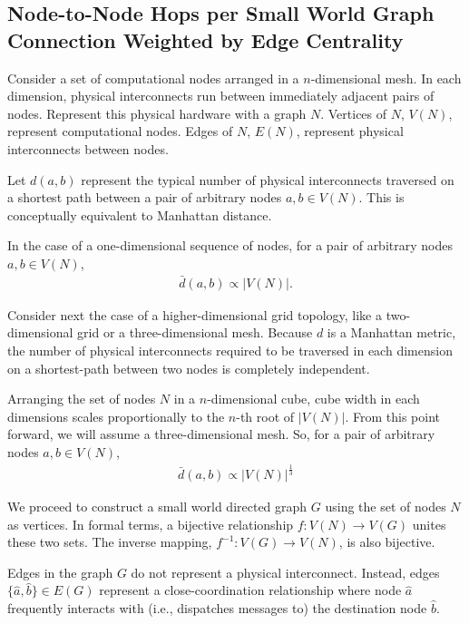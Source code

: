 \subsection{Node-to-Node Hops per Small World Graph Connection Weighted by Edge Centrality}

Consider a set of computational nodes arranged in a $n$-dimensional mesh.
In each dimension, physical interconnects run between immediately adjacent pairs of nodes.
Represent this physical hardware with a graph $N$.
Vertices of $N$, $V(N)$, represent computational nodes.
Edges of $N$, $E(N)$, represent physical interconnects between nodes.

Let $d(a,b)$ represent the typical number of physical interconnects traversed on a shortest path between a pair of arbitrary nodes $a, b \in V(N)$.
This is conceptually equivalent to Manhattan distance.

In the case of a one-dimensional sequence of nodes, for a pair of arbitrary nodes $a,b \in V(N)$,
\begin{align*}
\bar{d}(a,b) \propto |V(N)|.
\end{align*}

Consider next the case of a higher-dimensional grid topology, like a two-dimensional grid or a three-dimensional mesh.
Because $d$ is a Manhattan metric, the number of physical interconnects required to be traversed in each dimension on a shortest-path between two nodes is completely independent.

Arranging the set of nodes $N$ in a $n$-dimensional cube, cube width in each dimensions scales proportionally to the $n$-th root of $|V(N)|$.
From this point forward, we will assume a three-dimensional mesh.
So, for a pair of arbitrary nodes $a,b \in V(N)$,
\begin{align} \label{eqn:mesh_prop}
\bar{d}(a, b) \propto |V(N)|^{\frac{1}{3}}
\end{align}

We proceed to construct a small world directed graph $G$ using the set of nodes $N$ as vertices.
In formal terms, a bijective relationship $f: V(N) \rightarrow V(G)$ unites these two sets.
The inverse mapping, $f^{-1}: V(G) \rightarrow V(N)$, is also bijective.

Edges in the graph $G$ do not represent a physical interconnect.
Instead, edges $\{\hat{a}, \hat{b}\} \in E(G)$ represent a close-coordination relationship where node $\hat{a}$ frequently interacts with (i.e., dispatches messages to) the destination node $\hat{b}$.

